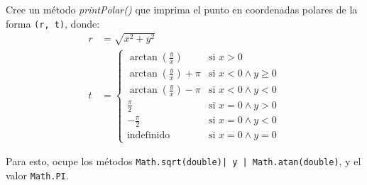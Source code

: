       \begin{exercise}
        Cree un método \textit{printPolar()} que imprima el punto en coordenadas polares 
        de la forma \texttt{(r, t)}, donde:
        \[
          \begin{aligned}
            r &= \sqrt{x^2 + y^2} \\
            t &= \begin{cases}
              \arctan\left(\frac{y}{x}\right)       
                & \mbox{si } x > 0                      \\
              \arctan\left(\frac{y}{x}\right) + \pi 
                & \mbox{si } x < 0 \wedge y \ge 0 \\
              \arctan\left(\frac{y}{x}\right) - \pi 
                & \mbox{si } x < 0 \wedge y < 0   \\
              \frac{\pi}{2}                         
                & \mbox{si } x = 0 \wedge y > 0   \\
              -\frac{\pi}{2}                         
                & \mbox{si } x = 0 \wedge y < 0   \\
              \text{indefinido}                     
                & \mbox{si } x = 0 \wedge y = 0
            \end{cases}
          \end{aligned}
        \]

        Para esto, ocupe los métodos 
        \texttt{Math.sqrt(double)| y | Math.atan(double)}, y el valor
        \texttt{Math.PI}.
      \end{exercise}
%